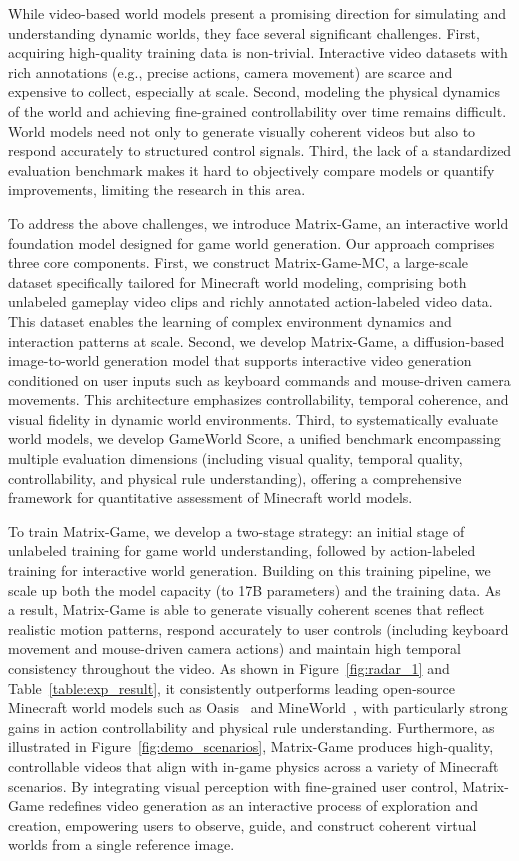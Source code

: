 \documentclass{article}
\begin{document}
While video-based world models present a promising direction for simulating and understanding dynamic worlds, they face several significant challenges. First, acquiring high-quality training data is non-trivial. Interactive video datasets with rich annotations (e.g., precise actions, camera movement) are scarce and expensive to collect, especially at scale. Second, modeling the physical dynamics of the world and achieving fine-grained controllability over time remains difficult. World models need not only to generate visually coherent videos but also to respond accurately to structured control signals. Third, the lack of a standardized evaluation benchmark makes it hard to objectively compare models or quantify improvements, limiting the research in this area. 

To address the above challenges, we introduce Matrix-Game, an interactive world foundation model designed for game world generation. Our approach comprises three core components. First, we construct Matrix-Game-MC, a large-scale dataset specifically tailored for Minecraft world modeling, comprising both unlabeled gameplay video clips and richly annotated action-labeled video data. This dataset enables the learning of complex environment dynamics and interaction patterns at scale. Second, we develop Matrix-Game, a diffusion-based image-to-world generation model that supports interactive video generation conditioned on user inputs such as keyboard commands and mouse-driven camera movements. This architecture emphasizes controllability, temporal coherence, and visual fidelity in dynamic world environments. Third, to systematically evaluate world models, we develop GameWorld Score, a unified benchmark encompassing multiple evaluation dimensions (including visual quality, temporal quality, controllability, and physical rule understanding), offering a comprehensive framework for quantitative assessment of Minecraft world models.


To train Matrix-Game, we develop a two-stage strategy: an initial stage of unlabeled training for game world understanding, followed by action-labeled training for interactive world generation. Building on this training pipeline, we scale up both the model capacity (to 17B parameters) and the training data. As a result, Matrix-Game is able to generate visually coherent scenes that reflect realistic motion patterns, respond accurately to user controls (including keyboard movement and mouse-driven camera actions) and maintain high temporal consistency throughout the video. As shown in Figure~\ref{fig:radar_1} and Table~\ref{table:exp_result}, it consistently outperforms leading open-source Minecraft world models such as Oasis~\cite{oasis2024} and MineWorld~\cite{guo2025mineworld}, with particularly strong gains in action controllability and physical rule understanding. Furthermore, as illustrated in Figure~\ref{fig:demo_scenarios}, Matrix-Game produces high-quality, controllable videos that align with in-game physics across a variety of Minecraft scenarios. By integrating visual perception with fine-grained user control, Matrix-Game redefines video generation as an interactive process of exploration and creation, empowering users to observe, guide, and construct coherent virtual worlds from a single reference image.
 
\end{document}
